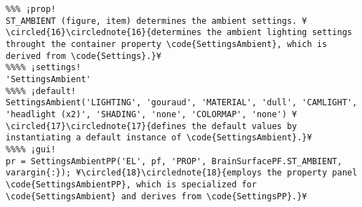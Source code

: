 \documentclass{tufte-handout}
\begin{document}
\begin{lstlisting}
%%% ¡prop!
ST_AMBIENT (figure, item) determines the ambient settings. ¥\circled{16}\circlednote{16}{determines the ambient lighting settings throught the container property \code{SettingsAmbient}, which is derived from \code{Settings}.}¥
%%%% ¡settings!
'SettingsAmbient'
%%%% ¡default!
SettingsAmbient('LIGHTING', 'gouraud', 'MATERIAL', 'dull', 'CAMLIGHT', 'headlight (x2)', 'SHADING', 'none', 'COLORMAP', 'none') ¥\circled{17}\circlednote{17}{defines the default values by instantiating a default instance of \code{SettingsAmbient}.}¥
%%%% ¡gui!
pr = SettingsAmbientPP('EL', pf, 'PROP', BrainSurfacePF.ST_AMBIENT, varargin{:}); ¥\circled{18}\circlednote{18}{employs the property panel \code{SettingsAmbientPP}, which is specialized for \code{SettingsAmbient} and derives from \code{SettingsPP}.}¥
\end{lstlisting}
\end{document}
